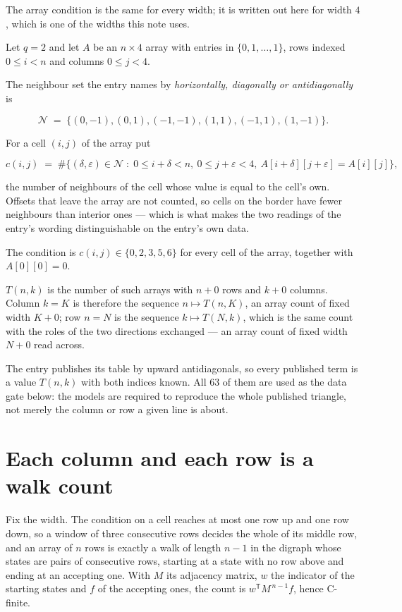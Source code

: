 \documentclass[11pt]{article}
\theoremstyle{definition}
\begin{document}
The array condition is the same for every width; it is written out here for width $4$, which is one of the widths this note uses.

Let $q = 2$ and let $A$ be an $n \times 4$ array with entries in $\{0,1,\dots,1\}$, rows indexed $0 \le i < n$ and columns $0 \le j < 4$.

The neighbour set the entry names by {\itshape horizontally, diagonally or antidiagonally} is

\[\mathcal{N} \;=\; \{(0,-1), (0,1), (-1,-1), (1,1), (-1,1), (1,-1)\}.\]

For a cell $(i,j)$ of the array put

\[c(i,j) \;=\; \#\bigl\{(\delta,\varepsilon)\in\mathcal{N} \;:\; 0\le i+\delta<n,\ 0\le j+\varepsilon<4,\ A[i+\delta][j+\varepsilon] = A[i][j]\bigr\},\]

the number of neighbours of the cell whose value is equal to the cell's own. Offsets that leave the array are not counted, so cells on the border have fewer neighbours than interior ones --- which is what makes the two readings of the entry's wording distinguishable on the entry's own data.

The condition is $c(i,j) \in \{0, 2, 3, 5, 6\}$ for every cell of the array, together with $A[0][0]=0$.

$T(n,k)$ is the number of such arrays with $n + 0$ rows and $k + 0$ columns. Column $k = K$ is therefore the sequence $n \mapsto T(n,K)$, an array count of fixed width $K + 0$; row $n = N$ is the sequence $k \mapsto T(N,k)$, which is the same count with the roles of the two directions exchanged --- an array count of fixed width $N + 0$ read across.

The entry publishes its table by upward antidiagonals, so every published term is a value $T(n,k)$ with both indices known. All 63 of them are used as the data gate below: the models are required to reproduce the whole published triangle, not merely the column or row a given line is about.

\section{Each column and each row is a walk count}

Fix the width. The condition on a cell reaches at most one row up and one row down, so a window of three consecutive rows decides the whole of its middle row, and an array of $n$ rows is exactly a walk of length $n-1$ in the digraph whose states are pairs of consecutive rows, starting at a state with no row above and ending at an accepting one. With $M$ its adjacency matrix, $w$ the indicator of the starting states and $f$ of the accepting ones, the count is $w^{\mathsf T}M^{\,n-1}f$, hence C-finite.
\end{document}
